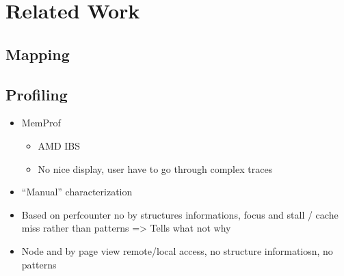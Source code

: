 \section{Related Work}
\label{sec:soa}
\subsection{Mapping}
\label{sec:soa-mapping}
\subsection{Profiling}
\label{sec:soa-profiling}

\begin{itemize}
    \item MemProf \cite{Lachaize12MemProf}
        \begin{itemize}
            \item AMD IBS
            \item No nice display, user have to go through complex traces
        \end{itemize}
    \item ``Manual'' characterization \cite{Majo13(Mis)understanding,Jiang14Understanding}

    \item Based on perfcounter no by structures informations, focus and stall
        / cache miss rather than patterns \cite{Bosch00Rivet, Weyers14Visualization}
        => Tells what not why
    \item Node and by page view remote/local access, no structure informatiosn,
        no patterns \cite{Tao01Visualizing}
\end{itemize}

